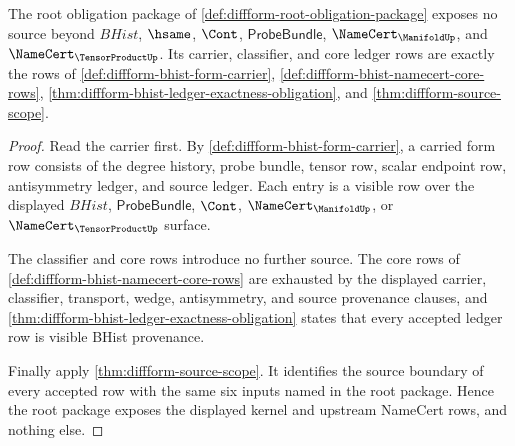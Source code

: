 \begin{theorem}
\label{thm:diffform-visible-source-surface-obligation}
The root obligation package of
\autoref{def:diffform-root-obligation-package} exposes no source beyond
$BHist$, $\hsame$, $\Cont$, $\mathsf{ProbeBundle}$,
$\NameCert_{\ManifoldUp}$, and $\NameCert_{\TensorProductUp}$. Its carrier,
classifier, and core ledger rows are exactly the rows of
\autoref{def:diffform-bhist-form-carrier},
\autoref{def:diffform-bhist-namecert-core-rows},
\autoref{thm:diffform-bhist-ledger-exactness-obligation}, and
\autoref{thm:diffform-source-scope}.
\end{theorem}
\begin{proof}
Read the carrier first. By \autoref{def:diffform-bhist-form-carrier}, a
carried form row consists of the degree history, probe bundle, tensor row,
scalar endpoint row, antisymmetry ledger, and source ledger. Each entry is a
visible row over the displayed $BHist$, $\mathsf{ProbeBundle}$,
$\Cont$, $\NameCert_{\ManifoldUp}$, or $\NameCert_{\TensorProductUp}$
surface.

The classifier and core rows introduce no further source. The core rows of
\autoref{def:diffform-bhist-namecert-core-rows} are exhausted by the
displayed carrier, classifier, transport, wedge, antisymmetry, and source
provenance clauses, and
\autoref{thm:diffform-bhist-ledger-exactness-obligation} states that every
accepted ledger row is visible BHist provenance.

Finally apply \autoref{thm:diffform-source-scope}. It identifies the source
boundary of every accepted row with the same six inputs named in the root
package. Hence the root package exposes the displayed kernel and upstream
NameCert rows, and nothing else.
\end{proof}

